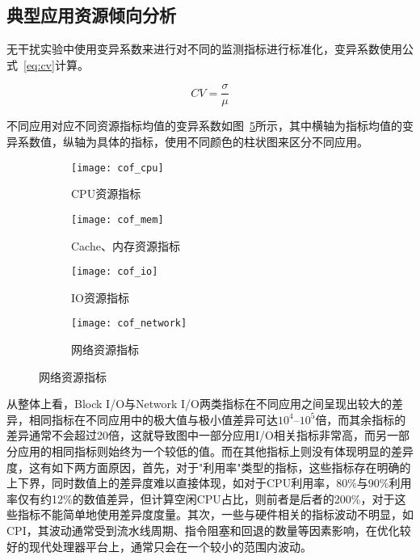 




\subsection{典型应用资源倾向分析}

无干扰实验中使用变异系数来进行对不同的监测指标进行标准化，变异系数使用公式~\eqref{eq:cv}计算。

\begin{equation}
    CV = \frac{\sigma}{\mu}
\label{eq:cv}
\end{equation}

不同应用对应不同资源指标均值的变异系数如图~\ref{fig:resource_affinity}所示，其中横轴为指标均值的变异系数值，纵轴为具体的指标，使用不同颜色的柱状图来区分不同应用。

\begin{figure}[H]
    \centering
    \begin{subfigure}[b]{0.49\textwidth}
      \texttt{[image: cof\_cpu]}
      \caption{CPU资源指标}
      \label{fig:cof_cpu}
    \end{subfigure}
    \begin{subfigure}[b]{0.49\textwidth}
        \texttt{[image: cof\_mem]}
        \caption{Cache、内存资源指标}
        \label{fig:cof_mem}
    \end{subfigure}
    \begin{subfigure}[b]{0.49\textwidth}
        \texttt{[image: cof\_io]}
        \caption{IO资源指标}
        \label{fig:cof_mem}
    \end{subfigure}
    \begin{subfigure}[b]{0.49\textwidth}
        \texttt{[image: cof\_network]}
        \caption{网络资源指标}
        \label{fig:cof_mem}
    \end{subfigure}
\label{fig:resource_affinity}
\end{figure}

从整体上看，Block I/O与Network I/O两类指标在不同应用之间呈现出较大的差异，相同指标在不同应用中的极大值与极小值差异可达$10^4$--$10^5$倍，而其余指标的差异通常不会超过20倍，这就导致图中一部分应用I/O相关指标非常高，而另一部分应用的相同指标则始终为一个较低的值。而在其他指标上则没有体现明显的差异度，这有如下两方面原因，首先，对于"利用率"类型的指标，这些指标存在明确的上下界，同时数值上的差异度难以直接体现，如对于CPU利用率，80\%与90\%利用率仅有约12\%的数值差异，但计算空闲CPU占比，则前者是后者的200\%，对于这些指标不能简单地使用差异度度量。其次，一些与硬件相关的指标波动不明显，如CPI，其波动通常受到流水线周期、指令阻塞和回退的数量等因素影响，在优化较好的现代处理器平台上，通常只会在一个较小的范围内波动。

